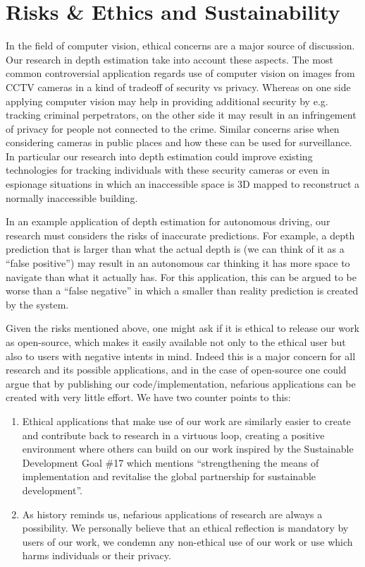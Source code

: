 \documentclass[12pt,twoside]{article}
\begin{document}
\section{Risks \& Ethics and Sustainability}
In the field of computer vision, ethical concerns are a major source of discussion. Our research in depth estimation take into account these aspects. The most common controversial application regards use of computer vision on images from CCTV cameras in a kind of tradeoff of security vs privacy. Whereas on one side applying computer vision may help in providing additional security by e.g. tracking criminal perpetrators, on the other side it may result in an infringement of privacy for people not connected to the crime. Similar concerns arise when considering cameras in public places and how these can be used for surveillance. In particular our research into depth estimation could improve existing technologies for tracking individuals with these security cameras or even in espionage situations in which an inaccessible space is 3D mapped to reconstruct a normally inaccessible building.

In an example application of depth estimation for autonomous driving, our research must considers the risks of inaccurate predictions. For example, a depth prediction that is larger than what the actual depth is (we can think of it as a ``false positive'') may result in an autonomous car thinking it has more space to navigate than what it actually has. For this application, this can be argued to be worse than a ``false negative'' in which a smaller than reality prediction is created by the system.

Given the risks mentioned above, one might ask if it is ethical to release our work as open-source, which makes it easily available not only to the ethical user but also to users with negative intents in mind. Indeed this is a major concern for all research and its possible applications, and in the case of open-source one could argue that by publishing our code/implementation, nefarious applications can be created with very little effort. We have two counter points to this:
\begin{enumerate}
    \item Ethical applications that make use of our work are similarly easier to create and contribute back to research in a virtuous loop, creating a positive environment where others can build on our work inspired by the Sustainable Development Goal \#17\footnotemark{} which mentions ``strengthening the means of implementation and revitalise the global partnership for sustainable development''.
    \item As history reminds us, nefarious applications of research are always a possibility. We personally believe that an ethical reflection is mandatory by users of our work, we condemn any non-ethical use of our work or use which harms individuals or their privacy.
\end{enumerate} 
\end{document}
